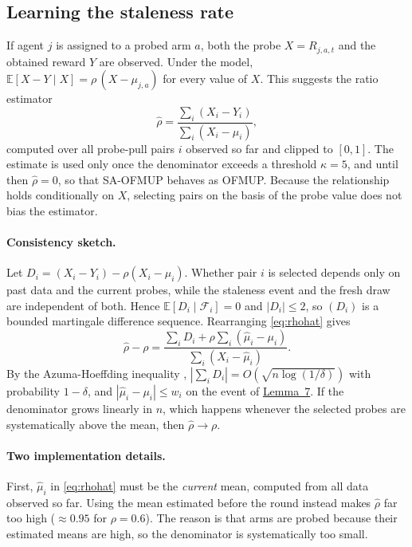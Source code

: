\documentclass[letterpaper]{article}
\newcommand{\E}{\mathbb{E}}
\newcommand{\rhat}{\hat{\rho}}
\begin{document}
\subsection{Learning the staleness rate}
\label{sec:learn}
If agent $j$ is assigned to a probed arm $a$, both the probe $X=R_{j,a,t}$ and the
obtained reward $Y$ are observed. Under the model,
$\E[X-Y\mid X]=\rho\,(X-\mu_{j,a})$ for every value of $X$. This suggests the
ratio estimator
\begin{equation}
  \rhat=\frac{\sum_i (X_i-Y_i)}{\sum_i (X_i-\hat\mu_i)},
  \label{eq:rhohat}
\end{equation}
computed over all probe-pull pairs $i$ observed so far and clipped to $[0,1]$.
The estimate is used only once the denominator exceeds a threshold $\kappa=5$,
and until then $\rhat=0$, so that SA-OFMUP behaves as OFMUP. Because the
relationship holds conditionally on $X$, selecting pairs on the basis of the
probe value does not bias the estimator.

\paragraph{Consistency sketch.}
Let $D_i=(X_i-Y_i)-\rho(X_i-\mu_i)$. Whether pair $i$ is selected depends only
on past data and the current probes, while the staleness event and the fresh
draw are independent of both. Hence $\E[D_i\mid\mathcal{F}_{i}]=0$ and
$|D_i|\le2$, so $(D_i)$ is a bounded martingale difference sequence. Rearranging
\eqref{eq:rhohat} gives
\begin{equation*}
  \rhat-\rho=\frac{\sum_i D_i+\rho\sum_i(\hat\mu_i-\mu_i)}{\sum_i(X_i-\hat\mu_i)} .
\end{equation*}
By the Azuma-Hoeffding inequality \citep{azuma1967weighted},
$|\sum_i D_i|=O(\sqrt{n\log(1/\delta)})$ with probability $1-\delta$, and
$|\hat\mu_i-\mu_i|\le w_i$ on the event of \hyperref[lem:7]{Lemma~7}. If the
denominator grows linearly in $n$, which happens whenever the selected probes
are systematically above the mean, then $\rhat\to\rho$.

\paragraph{Two implementation details.}
First, $\hat\mu_i$ in \eqref{eq:rhohat} must be the \emph{current} mean, computed
from all data observed so far. Using the mean estimated before the round
instead makes $\rhat$ far too high ($\approx0.95$ for $\rho=0.6$). The reason is
that arms are probed because their estimated means are high, so the denominator
is systematically too small.
\end{document}
